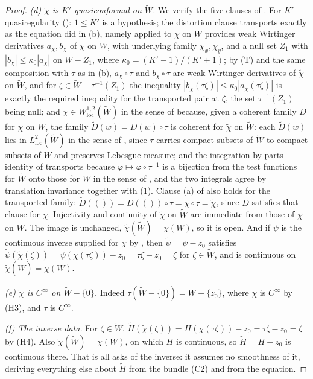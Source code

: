 \begin{proof}
\emph{(d) $\tilde\chi$ is $K'$-quasiconformal on $\widetilde W$.}  We verify
the five clauses of .  For $K'$-quasiregularity
(): $1\le K'$ is a hypothesis; the distortion clause
transports exactly as the equation did in (b), namely
 applied to $\chi$ on $W$ provides weak Wirtinger
derivatives $a_\chi,b_\chi$ of $\chi$ on $W$, with underlying family
$\chi_x,\chi_y$, and a null set $Z_1$ with
$|b_\chi|\le\kappa_0|a_\chi|$ on $W-Z_1$, where $\kappa_0=(K'-1)/(K'+1)$; by
(T) and the same composition with $\tau$ as in (b), $a_\chi\circ\tau$ and
$b_\chi\circ\tau$ are weak Wirtinger derivatives of $\tilde\chi$ on
$\widetilde W$, and for $\zeta\in\widetilde W-\tau^{-1}(Z_1)$ the inequality
$|b_\chi(\tau\zeta)|\le\kappa_0|a_\chi(\tau\zeta)|$ is exactly the required
inequality for the transported pair at $\zeta$, the set $\tau^{-1}(Z_1)$ being
null; and $\tilde\chi\in W^{1,2}_{\mathrm{loc}}(\widetilde W)$ in
the sense of  because, given a coherent family $D$ for
$\chi$ on $W$, the family $\widetilde D(w)=D(w)\circ\tau$ is coherent for
$\tilde\chi$ on $\widetilde W$: each $\widetilde D(w)$ lies in
$L^2_{\mathrm{loc}}(\widetilde W)$ in the sense of , since
$\tau$ carries compact subsets of $\widetilde W$ to compact subsets of $W$ and
preserves Lebesgue measure; and the integration-by-parts identity of
 transports because $\varphi\mapsto\varphi\circ\tau^{-1}$
is a bijection from the test functions for $\widetilde W$ onto those for $W$ in
the sense of , and the two integrals agree by translation
invariance together with (1).  Clause (a) of  also holds for
the transported family: $\widetilde D(())=D(())\circ\tau=\chi\circ\tau=\tilde\chi$,
since $D$ satisfies that clause for $\chi$.  Injectivity and continuity of $\tilde\chi$ on
$\widetilde W$ are immediate from those of $\chi$ on $W$.  The image is
unchanged, $\tilde\chi(\widetilde W)=\chi(W)$, so it is open.  And if $\psi$ is
the continuous inverse supplied for $\chi$ by , then
$\tilde\psi=\psi-z_0$ satisfies
$\tilde\psi(\tilde\chi(\zeta))=\psi(\chi(\tau\zeta))-z_0=\tau\zeta-z_0=\zeta$
for $\zeta\in\widetilde W$, and is continuous on
$\tilde\chi(\widetilde W)=\chi(W)$.

\emph{(e) $\tilde\chi$ is $C^\infty$ on $\widetilde W-\{0\}$.}  Indeed
$\tau(\widetilde W-\{0\})=W-\{z_0\}$, where $\chi$ is $C^\infty$ by (H3), and
$\tau$ is $C^\infty$.

\emph{(f) The inverse data.}  For $\zeta\in\widetilde W$,
$\widetilde H(\tilde\chi(\zeta))=H(\chi(\tau\zeta))-z_0=\tau\zeta-z_0=\zeta$ by
(H4).  Also $\tilde\chi(\widetilde W)=\chi(W)$, on which $H$ is continuous, so
$\widetilde H=H-z_0$ is continuous there.  That is all  asks of
the inverse: it assumes no smoothness of it, deriving everything else about
$\widetilde H$ from the bundle (C2) and from the equation.


\end{proof}
